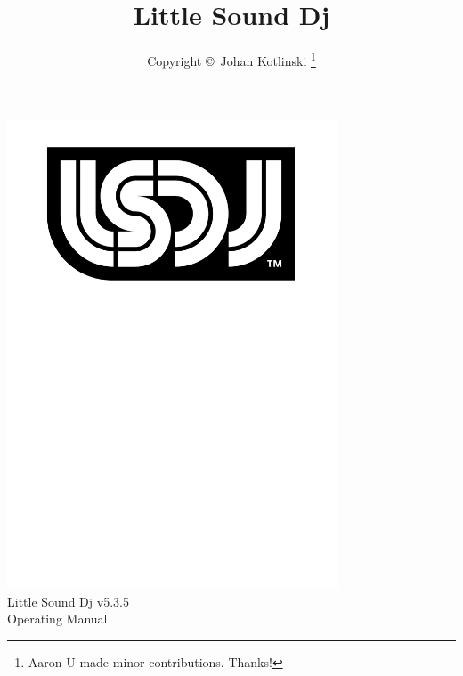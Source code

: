 \documentclass[a4paper,12pt,titlepage]{book}
\author{Copyright \copyright~Johan Kotlinski \thanks{Aaron U made minor contributions. Thanks!}}
\title{Little Sound Dj \lsdjversion{}}
\newcommand{\lsdjversion}{v5.3.5}
\begin{document}
\begin{titlepage}
\begin{center}
\vspace*{2.75cm}
\includegraphics[width=9.85cm]{lsdj_black_rgb}\\
\vspace*{1.00cm}
\normalfont\sffamily
\LARGE
Little Sound Dj \lsdjversion{}
\\
\vspace*{0.65cm}
Operating Manual
\end{center}
\end{titlepage}

\maketitle
\tableofcontents








\end{document}
